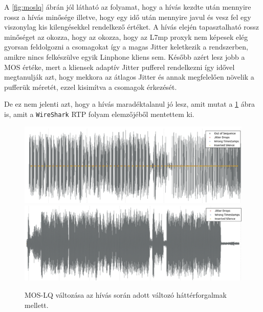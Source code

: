 
A \ref{fig:moslq} ábrán jól látható az folyamat, hogy a hívás kezdte után mennyire rossz 
a hívás minősége illetve, hogy egy idő után mennyire javul és vesz fel egy viszonylag kis 
kilengésekkel rendelkező értéket. A hívás elején tapasztalható rossz minőséget az okozza, 
hogy az okozza, hogy az L7mp proxyk nem képesek elég gyorsan feldolgozni a csomagokat így 
a magas Jitter keletkezik a rendszerben, amikre nincs felkészülve egyik Linphone kliens 
sem. Később azért lesz jobb a MOS értéke, mert a kliensek adaptív Jitter pufferel 
rendelkezni így idővel megtanulják azt, hogy mekkora az átlagos Jitter és annak 
megfelelően növelik a pufferük méretét, ezzel kisimítva a csomagok érkezését. 

De ez nem jelenti azt, hogy a hívás maradéktalanul jó lesz, amit mutat a
\ref{fig:voiceComp} ábra is, amit a \texttt{WireShark} RTP folyam elemzőjéből mentettem 
ki. 

\begin{figure}[!ht]
	\centering
	\includegraphics[width=1\textwidth, keepaspectratio]{figures/calls60.png}
	\includegraphics[width=1\textwidth, keepaspectratio]{figures/calls20.png}
	\caption{MOS-LQ változása az hívás során adott változó háttérforgalmak mellett.}
	\label{fig:voiceComp}
\end{figure}

